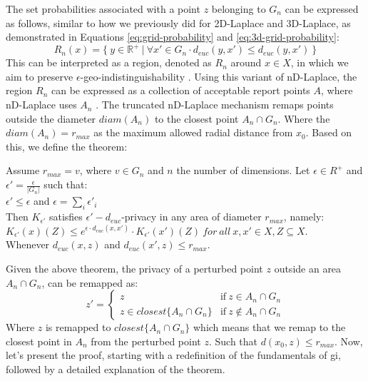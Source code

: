 The set probabilities associated with a point $z$ belonging to $G_n$ can be expressed as follows, similar to how we previously did for 2D-Laplace and 3D-Laplace, as demonstrated in Equations \ref{eq:grid-probability} and \ref{eq:3d-grid-probability}:
\begin{equation}
R_n(x) = \{ \ y \in \mathbb{R}^+ \ | \ \forall x' \in G_n \cdot d_{euc}(y, x') \leq d_{euc}(y, x') \ \}
\end{equation}
This can be interpreted as a region, denoted as $R_n$ around $x \in X$, in which we aim to preserve $\epsilon$-geo-indistinguishability \citep{9646489}.
Using this variant of nD-Laplace, the region $R_n$ can be expressed as a collection of acceptable report points $A$, where nD-Laplace uses $A_n$ \citep{DBLP:journals/corr/abs-1212-1984}.
The truncated nD-Laplace mechanism remaps points outside the diameter $diam(A_n)$ to the closest point $A_n \cap G_n$. 
Where the $diam(A_n) = r_{max}$ as the maximum allowed radial distance from $x_0$. \newline
Based on this, we define the theorem:
\begin{theorem}
Assume  $r_{max} = v$, where $v \in G_n$ and $n$ the number of dimensions. Let $\epsilon \in R^+$ and $\epsilon' = \frac{\epsilon}{|G_n|}$ such that: \\
  $\epsilon' \leq \epsilon$ and $\epsilon = \sum_i{\epsilon'_i}$ \\
  Then $K_{\epsilon'}$ satisfies $\epsilon'-d_{euc}$-privacy in any area of diameter $r_{max}$, namely: \\ 
  $K_{\epsilon'}(x)(Z) \leq e^{\epsilon \cdot d_{euc} (x, x')} \cdot K_{\epsilon'}(x')(Z) \ for \ all \ x, x' \in X, Z \subseteq X$.  \\
  Whenever $d_{euc}(x, z)$ and $d_{euc}(x', z) \leq r_{max}$.
  \label{theorem:nd-laplace-truncation}
\end{theorem}
Given the above theorem, the privacy of a perturbed point $z$ outside an area $A_n \cap G_n$, can be remapped as:
\begin{equation}
z' = 
\begin{cases}
        z & \text{if} \ z \in A_n \cap G_n \\ 
        z \in closest \{ A_n \cap G_n \}  & \text{if} \ z \notin A_n \cap G_n
    \end{cases}    
\end{equation}
Where $z$ is remapped to $closest \{ A_n \cap G_n \}$ which means that we remap to the closest point in $A_n$ from the perturbed point $z$. Such that $d(x_0, z) \leq r_{max}$.  \newline
Now, let's present the proof, starting with a redefinition of the fundamentals of \gls{gi}, followed by a detailed explanation of the theorem. \newline

